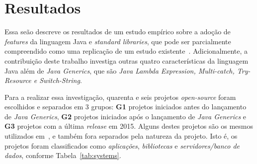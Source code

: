 \section{Resultados}\label{sec:resultados}

Essa seão descreve os resultados de 
um estudo empírico sobre a adoção de \textit{features} da 
linguagem Java e \textit{standard libraries}, que pode 
ser parcialmente compreendido como uma replicação de um estudo 
existente~\cite{Parnin:ACM2011}. Adicionalmente, a contribuição deste trabalho 
investiga outras quatro características da linguagem Java além de \textit{Java Generics}, 
que são \textit{Java Lambda Expression, Multi-catch, Try-Resource e Switch-String}.  



Para a realizar essa investigação, quarenta e seis projetos \textit{open-source} foram escolhidos e separados em 3 
grupos: \textbf{G1} projetos iniciados antes do lançamento de \textit{Java Generics}, \textbf{G2} projetos iniciados 
após o lançamento de \textit{Java Generics} e \textbf{G3} projetos com a última \textit{release} em 2015. 
Alguns destes projetos são os mesmos utilizados em~\cite{Parnin:ACM2011, Dyer:ACM2014, ward2015performance}, 
e também fora separados pela natureza da projeto. Isto é, os projetos foram 
classificados como \emph{aplicações}, \emph{bibliotecas} e \emph{servidores/banco de dados}, 
conforme Tabela~\ref{tab:systems}. 

